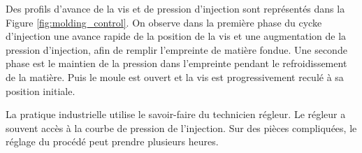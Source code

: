 Des profils d'avance de la vis et de pression d'injection sont représentés dans la Figure \ref{fig:molding_control}.
On observe dans la première phase du cycke d'injection une avance rapide de la position de la vis et une augmentation de la pression d'injection, afin de remplir l'empreinte de matière fondue.
Une seconde phase est le maintien de la pression dans l'empreinte pendant le refroidissement de la matière.
Puis le moule est ouvert et la vis est progressivement reculé à sa position initiale.

La pratique industrielle utilise le savoir-faire du technicien régleur.  %
Le régleur a souvent accès à la courbe de pression de l'injection.
Sur des pièces compliquées, le réglage du procédé peut prendre plusieurs heures.

\bigskip

\bigskip

